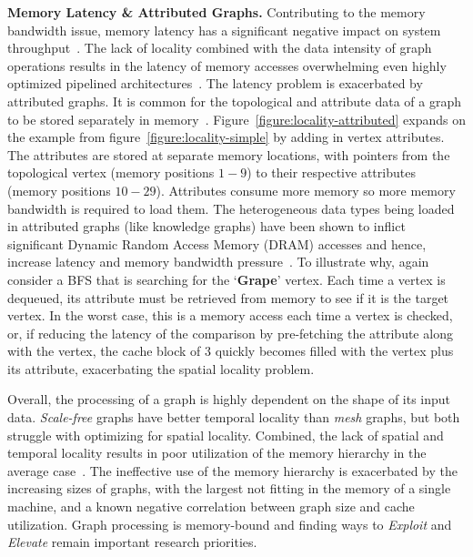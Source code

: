 \textbf{Memory Latency \& Attributed Graphs.} 
Contributing to the memory bandwidth issue, memory latency has a significant negative impact on system throughput~\cite{Beamer2015}.
The lack of locality combined with the data intensity of graph operations results in the latency of memory accesses overwhelming even highly optimized pipelined architectures~\cite{Dysart2016}.
The latency problem is exacerbated by attributed graphs. 
It is common for the topological and attribute data of a graph to be stored separately in memory~\cite{Buluc2013}. 
Figure~\ref{figure:locality-attributed} expands on the example from figure~\ref{figure:locality-simple} by adding in vertex attributes. 
The attributes are stored at separate memory locations, with pointers from the topological vertex (memory positions $1-9$) to their respective attributes (memory positions $10-29$). 
Attributes consume more memory so more memory bandwidth is required to load them.
The heterogeneous data types being loaded in attributed graphs (like knowledge graphs) have been shown to inflict significant Dynamic Random Access Memory (DRAM) accesses and hence, increase latency and memory bandwidth pressure~\cite{Basak2019}.
To illustrate why, again consider a BFS that is searching for the `\textbf{Grape}' vertex. 
Each time a vertex is dequeued, its attribute must be retrieved from memory to see if it is the target vertex. 
In the worst case, this is a memory access each time a vertex is checked, or, if reducing the latency of the comparison by pre-fetching the attribute along with the vertex, the cache block of $3$ quickly becomes filled with the vertex plus its attribute, exacerbating the spatial locality problem.

Overall, the processing of a graph is highly dependent on the shape of its input data. 
\textit{Scale-free} graphs have better temporal locality than \textit{mesh} graphs, but both struggle with optimizing for spatial locality. 
Combined, the lack of spatial and temporal locality results in poor utilization of the memory hierarchy in the average case~\cite{Balaji2018}.
The ineffective use of the memory hierarchy is exacerbated by the increasing sizes of graphs, with the largest not fitting in the memory of a single machine, and a known negative correlation between graph size and cache utilization. 
Graph processing is memory-bound and finding ways to \textit{Exploit} and \textit{Elevate} remain important research priorities. 

